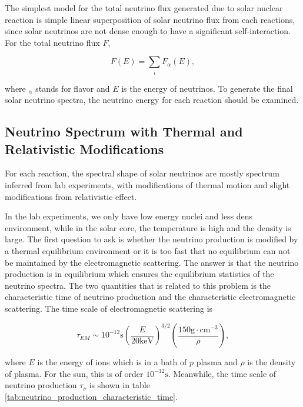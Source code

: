 The simplest model for the total neutrino flux generated due to solar nuclear reaction is simple linear superposition of solar neutrino flux from each reactions, since solar neutrinos are not dense enough to have a significant self-interaction. For the total neutrino flux $F$,

\begin{equation}
F(E) = \sum_i F_\alpha (E),
\end{equation}

where ${}_{\alpha}$ stands for flavor and $E$ is the energy of neutrinos. To generate the final solar neutrino spectra, the neutrino energy for each reaction should be examined.

\subsection{Neutrino Spectrum with Thermal and Relativistic Modifications}

For each reaction, the spectral shape of solar neutrinos are mostly spectrum inferred from lab experiments, with modifications of thermal motion and slight modifications from relativistic effect.\cite{Bahcall1991} 

In the lab experiments, we only have low energy nuclei and less dens environment, while in the solar core, the temperature is high and the density is large. The first question to ask is whether the neutrino production is modified by a thermal equilibrium environment or it is too fast that no equilibrium can not be maintained by the electromagnetic scattering. The answer is that the neutrino production is in equilibrium which ensures the equilibrium statistics of the neutrino spectra.\cite{Bahcall1991} The two quantities that is related to this problem is the characteristic time of neutrino production and the characteristic electromagnetic scattering. The time scale of electromagnetic scattering is \cite{Bahcall1991}

\begin{equation}
\tau_{EM} \sim 10^{-12} \mathrm{s} \left( \frac{E}{20\mathrm{keV}} \right)^{3/2}\left( \frac{150 \mathrm{g \cdot cm^{-3}} }{\rho} \right),
\end{equation}

where $E$ is the energy of ions which is in a bath of $p$ plasma and $\rho$ is the density of plasma. For the sun, this is of order $10^{-12}\mathrm{s}$. Meanwhile, the time scale of neutrino production $\tau_{\nu}$ is shown in table \ref{tab:neutrino_production_characteristic_time}.


